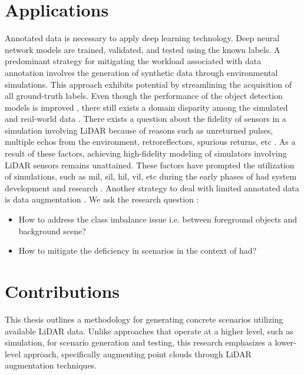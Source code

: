 \section{Applications}
Annotated data is necessary to apply deep learning technology. Deep neural network models are trained, validated, and tested using the known labels. A predominant strategy for mitigating the workload associated with data annotation involves the generation of synthetic data through environmental simulations. This approach exhibits potential by streamlining the acquisition of all ground-truth labels. Even though the performance of the object detection models is improved \parencite{johnsonroberson2017driving}, there still exists a domain disparity among the simulated and real-world data \parencite{care_real_and_syn_gap}. There exists a question about the fidelity of sensors in a simulation involving LiDAR because of reasons such as unreturned pulses, multiple echos from the environment, retroreflectors, spurious returns, etc \parencite{zero_domain_gap}. As a result of these factors, achieving high-fidelity modeling of simulators involving LiDAR sensors remains unattained. These factors have prompted the utilization of simulations, such as \acrfull{mil}, \acrfull{sil}, \acrfull{hil}, \acrfull{vil}, etc during the early phases of \acrshort{had} system development and research \parencite{x_in_loop}. Another strategy to deal with limited annotated data is data augmentation \parencite{lidar_aug}. We ask the research question : 
\begin{itemize}
    \item How to address the class imbalance issue i.e. between foreground objects and background scene?
    \item How to mitigate the deficiency in scenarios in the context of \acrshort{had}?
\end{itemize}

\section{Contributions}
This thesis outlines a methodology for generating concrete scenarios utilizing available LiDAR data. Unlike approaches that operate at a higher level, such as simulation, for scenario generation and testing, this research emphasizes a lower-level approach, specifically augmenting point clouds through LiDAR augmentation techniques.

